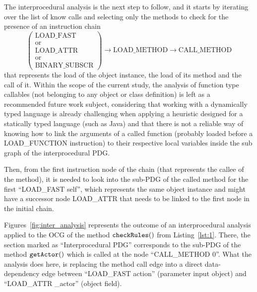 \documentclass[%
  chapterprefix=false,%
  open=right,%
  twoside=true,%
  paper=a4,%
  logofile={Figures/logo.png},%
  thesistype=master,%
  UKenglish,%
]{se2thesis}
\newcommand{\callable}[2][]{\(\text{\texttt{#2}}(#1)\)}
\begin{document}
The interprocedural analysis is the next step to follow, and it starts by iterating over the list of know calls and selecting only the methods to check for the presence of an instruction chain 
\[\begin{pmatrix} \text{LOAD\_FAST} \\ \text{or} \\ \text{LOAD\_ATTR} \\ \text{or} \\ \text{BINARY\_SUBSCR} \end{pmatrix} \rightarrow \text{LOAD\_METHOD} \rightarrow \text{CALL\_METHOD}\]
that represents the load of the object instance, the load of its method and the call of it.
Within the scope of the current study, the analysis of function type callables (not belonging to any object or class definition) is left as a recommended future work subject, considering that working with a dynamically typed language is already challenging when applying a heuristic designed for a statically typed language (such as Java) and that there is not a reliable way of knowing how to link the arguments of a called function (probably loaded before a LOAD\_FUNCTION instruction) to their respective local variables inside the sub graph of the interprocedural PDG.\@

Then, from the first instruction node of the chain (that represents the callee of the method), it is needed to look into the sub-PDG of the called method for the first ``LOAD\_FAST self'', which represents the same object instance and might have a successor node LOAD\_ATTR that needs to be linked to the first node in the initial chain.

Figures~\ref{fig:inter_analysis} represents the outcome of an interprocedural analysis applied to the OCG of the method \callable{checkRules} from Listing~\ref{lst:1}.
There, the section marked as ``Interprocedural PDG'' corresponds to the sub-PDG of the method \callable{getActor} which is called at the node ``CALL\_METHOD 0''.
What the analysis does here, is replacing the method call edge into a direct data-dependency edge between ``LOAD\_FAST action'' (parameter input object) and ``LOAD\_ATTR \_actor'' (object field).
\end{document}
